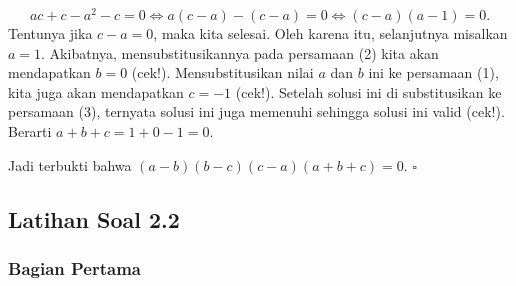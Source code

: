 \begin{jawab}
		\[ ac + c - a^{2} - c = 0 \iff a\left(c - a\right) - \left(c - a\right) = 0 \iff \left(c - a\right)\left(a - 1\right) = 0. \]
		Tentunya jika $ c - a = 0 $, maka kita selesai. Oleh karena itu, selanjutnya misalkan $ a = 1 $. Akibatnya, mensubstitusikannya pada persamaan (2) kita akan mendapatkan $ b = 0 $ (cek!). Mensubstitusikan nilai $ a $ dan $ b $ ini ke persamaan (1), kita juga akan mendapatkan $ c = -1 $ (cek!). Setelah solusi ini di substitusikan ke persamaan (3), ternyata solusi ini juga memenuhi sehingga solusi ini valid (cek!). Berarti $ a + b + c = 1 + 0 - 1 = 0 $.
		\par Jadi terbukti bahwa $ \left(a - b\right)\left(b - c\right)\left(c - a\right)\left(a + b + c\right) = 0 $. \hfill $ \square $
	\end{jawab}
	
\newpage

\subsection{Latihan Soal 2.2}
	
	\subsubsection{Bagian Pertama}
		

